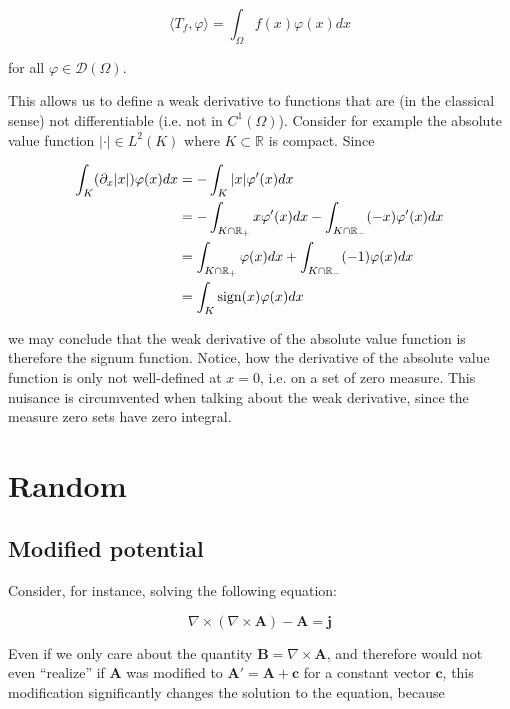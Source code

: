 \documentclass[11pt, a4paper]{article}
\begin{document}
\begin{equation}
    \langle T_f , \varphi \rangle = \int_{\Omega} f(x) \varphi(x) dx
\end{equation}

for all $\varphi \in \mathcal{D}(\Omega)$.

This allows us to define a weak derivative to functions that are (in the classical
sense) not differentiable (i.e. not in $C^1(\Omega)$). Consider for example the 
absolute value function $|\cdot| \in L^2(K)$ where $K \subset \mathbb{R}$ is compact.
Since

\begin{align}
    \int_K (\partial_x |x|) \varphi(x) dx &= -\int_K |x| \varphi'(x) dx \notag \\ 
    &= - \int_{K \cap \mathbb{R}_+} x \varphi'(x) dx - \int_{K \cap \mathbb{R}_-} (-x) \varphi'(x) dx \notag \\ 
    &= \int_{K \cap \mathbb{R}_+} \varphi(x) dx + \int_{K \cap \mathbb{R}_-} (-1) \varphi(x) dx \notag \\
    &= \int_K \text{sign}(x) \varphi(x) dx
\end{align}

we may conclude that the weak derivative of the absolute value function is therefore
the signum function. Notice, how the derivative of the absolute value function
is only not well-defined at $x=0$, i.e. on a set of zero measure. This nuisance
is circumvented when talking about the weak derivative, since the measure zero
sets have zero integral.

\section{Random}
\label{sec:random}

\subsection{Modified potential}
\label{subsec:modpot}

Consider, for instance, solving the following equation:

\begin{equation}
    \nabla \times (\nabla \times \mathbf{A}) - \mathbf{A} = \mathbf{j}
\end{equation}

Even if we only care about the quantity $\mathbf{B} = \nabla \times \mathbf{A}$,
and therefore would not even \enquote{realize} if $\mathbf{A}$ was modified to
$\mathbf{A}' = \mathbf{A} + \mathbf{c}$ for a constant vector $\mathbf{c}$, this
modification significantly changes the solution to the equation, because 
\end{document}
